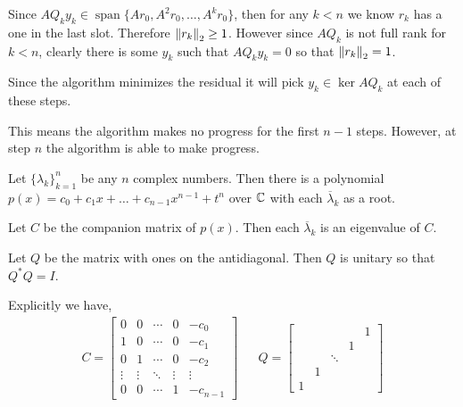 \documentclass[10pt]{article}
\begin{document}
\begin{solution}[Solution]
\begin{enumerate}
        Since \( AQ_ky_k \in \operatorname{span}\{Ar_0, A^2r_0, \ldots, A^k r_0\} \), then for any \( k<n \) we know \( r_k \) has a one in the last slot. Therefore \( \left\lVert r_k\right\rVert_2 \geq 1 \). However since \( AQ_k \) is not full rank for \( k<n \), clearly there is some \( y_k \) such that \( AQ_ky_k = 0 \) so that \( \left\lVert r_k\right\rVert_2 = 1 \). 

        Since the algorithm minimizes the residual it will pick \( y_k \in \operatorname{ker} AQ_k \) at each of these steps.

        This means the algorithm makes no progress for the first \( n-1 \) steps. However, at step \( n \) the algorithm is able to make progress.

        \vspace{1em}
        
        
        Let \( \{\lambda_k\}_{k=1}^{n} \) be any \( n \) complex numbers. Then there is a polynomial \( p(x) = c_0 + c_1x + \ldots + c_{n-1}x^{n-1} + t^n \) over \( \mathbb{C} \) with each \( \overline{\lambda}_k \) as a root. 

        Let \( C \) be the companion matrix of \( p(x) \). Then each \( \overline{\lambda}_k \) is an eigenvalue of \( C \).

        Let \( Q \) be the matrix with ones on the antidiagonal. Then \( Q \) is unitary so that \( Q^*Q = I \).

        Explicitly we have,
        \begin{align*}
            C = 
            \left[\begin{array}{rrrrr}
                0 & 0 &\cdots & 0 & -c_0 \\
                1 & 0 & \cdots & 0 & -c_1 \\
                0 & 1 & \cdots & 0 & -c_2 \\
                \vdots & \vdots & \ddots  & \vdots & \vdots \\
                0 & 0 & \cdots & 1 & -c_{n-1}
            \end{array}\right]
            &&
            Q = 
            \left[\begin{array}{rrrrr}
                &&&&1\\
                &&&1\\
                &&\ddots\\
                &1\\
                1
            \end{array}\right]
        \end{align*}


\end{enumerate}
\end{solution}
\end{document}
